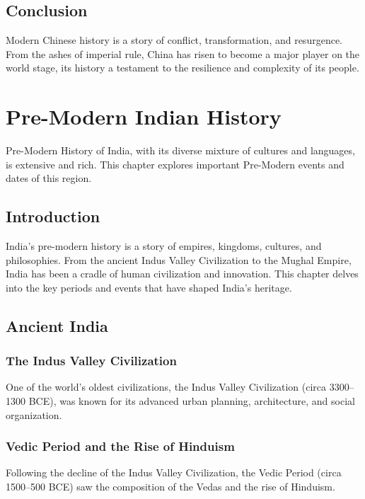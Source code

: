 \documentclass[a4paper,12pt]{book}
\begin{document}
\section{Conclusion}
\label{sec:conclusion}
Modern Chinese history is a story of conflict, transformation, and resurgence. From the ashes of imperial rule, China has risen to become a major player on the world stage, its history a testament to the resilience and complexity of its people.

\chapter{Pre-Modern Indian History}
\label{ch:pre-modern-indian-history}

Pre-Modern History of India, with its diverse mixture of cultures and languages, is extensive and rich. This chapter explores important Pre-Modern events and dates of this region.

\section{Introduction}
\label{sec:introduction-pre-modern-india}
India's pre-modern history is a story of empires, kingdoms, cultures, and philosophies. From the ancient Indus Valley Civilization to the Mughal Empire, India has been a cradle of human civilization and innovation. This chapter delves into the key periods and events that have shaped India’s heritage.

\section{Ancient India}
\label{sec:ancient-india}

\subsection{The Indus Valley Civilization}
One of the world’s oldest civilizations, the Indus Valley Civilization (circa 3300–1300 BCE), was known for its advanced urban planning, architecture, and social organization.

\subsection{Vedic Period and the Rise of Hinduism}
Following the decline of the Indus Valley Civilization, the Vedic Period (circa 1500–500 BCE) saw the composition of the Vedas and the rise of Hinduism.
\end{document}
